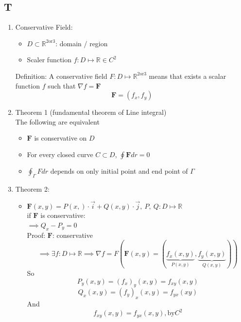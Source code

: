 \documentclass[../main.tex]{subfiles}
\begin{document}
\subsection{T}
\begin{enumerate}
\item Conservative Field:
\begin{itemize}
\item $D \subset \mathbb{R}^{2\text{or}3}$: domain / region
\item Scaler function $f: D \mapsto \mathbb{R} \in C^2$
\end{itemize}
Definition: A conservative field $F: D \mapsto \mathbb{R}^{2\text{or}3}$ means that exists a scalar function $f$ such that $\nabla f = \bm{F}$
\begin{equation}
\bm{F} = (f_x,f_y)
\end{equation}
\item Theorem 1 (fundamental theorem of Line integral)\\
The following are equivalent
\begin{itemize}
\item $\bm{F}$ is conservative on $D$
\item For every closed curve $C \subset D$, $\oint \bm{F} dr= 0$
\item $\oint_\Gamma F dr $ depends on only initial point and end point of $\Gamma$
\end{itemize}
\item Theorem 2:
\begin{itemize}
\item $\bm{F}(x,y) = P(x,)\cdot \vec{i} + Q(x,y) \cdot \vec{j}, ~P,~Q: D \mapsto \mathbb{R}$\\
if $\bm{F}$ is conservative:\\
$\implies Q_x-P_y = 0$\\
Proof:
$\mathbf{F}$: conservative
\begin{equation}
\implies \exists f: D \mapsto \mathbb{R} \implies \nabla f = F
\left(
\bm{F}(x,y) = (\underbrace{f_x(x,y)}_{P(x,y)}, \underbrace{f_y(x,y)}_{Q(x,y)})
\right)
\end{equation}
So 
\begin{equation}
P_y(x,y) = (f_x)_y(x,y) = f_{xy} (x,y) 
\end{equation}
\begin{equation}
Q_x(x,y) = (f_y)_x(x,y) = f_{yx}(xy)
\end{equation}
And
\begin{equation}
f_{xy}(x,y) = f_{yx}(x,y) , \text{by} C^2
\end{equation}

\end{itemize}
\end{enumerate}
\end{document}
